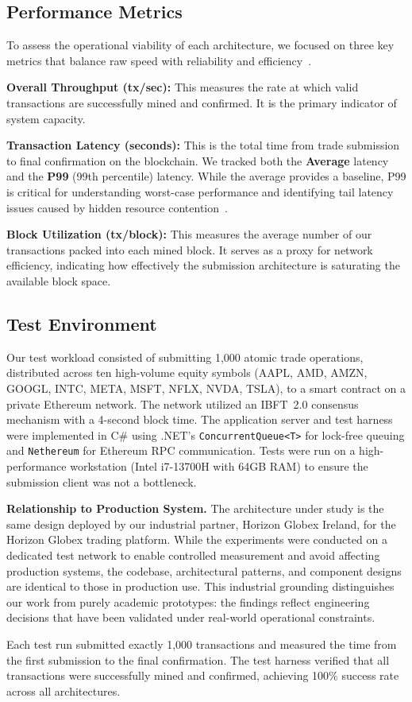 \subsection{Performance Metrics}

To assess the operational viability of each architecture, we focused on three key metrics that balance raw speed with reliability and efficiency~\cite{john2007performance}.

\textbf{Overall Throughput (tx/sec):} This measures the rate at which valid transactions are successfully mined and confirmed. It is the primary indicator of system capacity.

\textbf{Transaction Latency (seconds):} This is the total time from trade submission to final confirmation on the blockchain. We tracked both the \textbf{Average} latency and the \textbf{P99} (99th percentile) latency. While the average provides a baseline, P99 is critical for understanding worst-case performance and identifying tail latency issues caused by hidden resource contention~\cite{dean2013tail}.

\textbf{Block Utilization (tx/block):} This measures the average number of our transactions packed into each mined block. It serves as a proxy for network efficiency, indicating how effectively the submission architecture is saturating the available block space.

\subsection{Test Environment}

Our test workload consisted of submitting 1,000 atomic trade operations, distributed across ten high-volume equity symbols (AAPL, AMD, AMZN, GOOGL, INTC, META, MSFT, NFLX, NVDA, TSLA), to a smart contract on a private Ethereum network. The network utilized an IBFT~2.0 consensus mechanism with a 4-second block time. The application server and test harness were implemented in C\# using .NET's \texttt{ConcurrentQueue<T>} for lock-free queuing and \texttt{Nethereum} for Ethereum RPC communication. Tests were run on a high-performance workstation (Intel i7-13700H with 64GB RAM) to ensure the submission client was not a bottleneck.

\textbf{Relationship to Production System.} The architecture under study is the same design deployed by our industrial partner, Horizon Globex Ireland, for the Horizon Globex trading platform. While the experiments were conducted on a dedicated test network to enable controlled measurement and avoid affecting production systems, the codebase, architectural patterns, and component designs are identical to those in production use. This industrial grounding distinguishes our work from purely academic prototypes: the findings reflect engineering decisions that have been validated under real-world operational constraints.

Each test run submitted exactly 1,000 transactions and measured the time from the first submission to the final confirmation. The test harness verified that all transactions were successfully mined and confirmed, achieving 100\% success rate across all architectures.

